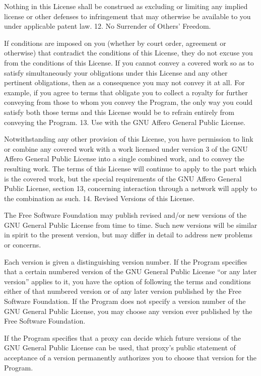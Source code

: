 {\begin{multicols}{4}
Nothing in this License shall be construed as excluding or limiting any implied license or other defenses to infringement that may otherwise be available to you under applicable patent law.
12. No Surrender of Others' Freedom.

If conditions are imposed on you (whether by court order, agreement or otherwise) that contradict the conditions of this License, they do not excuse you from the conditions of this License. If you cannot convey a covered work so as to satisfy simultaneously your obligations under this License and any other pertinent obligations, then as a consequence you may not convey it at all. For example, if you agree to terms that obligate you to collect a royalty for further conveying from those to whom you convey the Program, the only way you could satisfy both those terms and this License would be to refrain entirely from conveying the Program.
13. Use with the GNU Affero General Public License.

Notwithstanding any other provision of this License, you have permission to link or combine any covered work with a work licensed under version 3 of the GNU Affero General Public License into a single combined work, and to convey the resulting work. The terms of this License will continue to apply to the part which is the covered work, but the special requirements of the GNU Affero General Public License, section 13, concerning interaction through a network will apply to the combination as such.
14. Revised Versions of this License.

The Free Software Foundation may publish revised and/or new versions of the GNU General Public License from time to time. Such new versions will be similar in spirit to the present version, but may differ in detail to address new problems or concerns.

Each version is given a distinguishing version number. If the Program specifies that a certain numbered version of the GNU General Public License “or any later version” applies to it, you have the option of following the terms and conditions either of that numbered version or of any later version published by the Free Software Foundation. If the Program does not specify a version number of the GNU General Public License, you may choose any version ever published by the Free Software Foundation.

If the Program specifies that a proxy can decide which future versions of the GNU General Public License can be used, that proxy's public statement of acceptance of a version permanently authorizes you to choose that version for the Program.


\end{multicols}}
